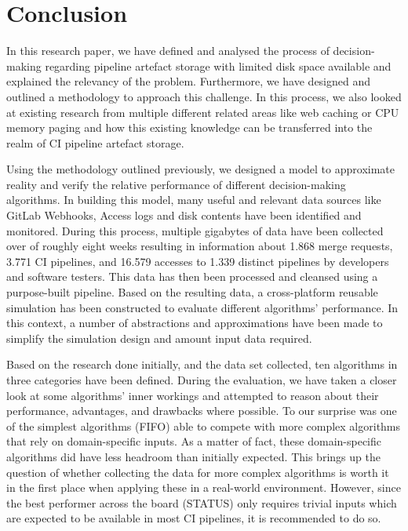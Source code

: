 \section{Conclusion}
    In this research paper, we have defined and analysed the process of decision-making regarding pipeline artefact storage with limited disk space available and explained the relevancy of the problem. Furthermore, we have designed and outlined a methodology to approach this challenge. In this process, we also looked at existing research from multiple different related areas like web caching or CPU memory paging and how this existing knowledge can be transferred into the realm of CI pipeline artefact storage.
    
    Using the methodology outlined previously, we designed a model to approximate reality and verify the relative performance of different decision-making algorithms. In building this model, many useful and relevant data sources like GitLab Webhooks, Access logs and disk contents have been identified and monitored. During this process, multiple gigabytes of data have been collected over of roughly eight weeks resulting in information about 1.868 merge requests, 3.771 CI pipelines, and 16.579 accesses to 1.339 distinct pipelines by developers and software testers. This data has then been processed and cleansed using a purpose-built pipeline. Based on the resulting data, a cross-platform reusable simulation has been constructed to evaluate different algorithms' performance. In this context, a number of abstractions and approximations have been made to simplify the simulation design and amount input data required.
    
    Based on the research done initially, and the data set collected, ten algorithms in three categories have been defined. During the evaluation, we have taken a closer look at some algorithms' inner workings and attempted to reason about their performance, advantages, and drawbacks where possible. To our surprise was one of the simplest algorithms (FIFO) able to compete with more complex algorithms that rely on domain-specific inputs. As a matter of fact, these domain-specific algorithms did have less headroom than initially expected. This brings up the question of whether collecting the data for more complex algorithms is worth it in the first place when applying these in a real-world environment. However, since the best performer across the board (STATUS) only requires trivial inputs which are expected to be available in most CI pipelines, it is recommended to do so.
    
